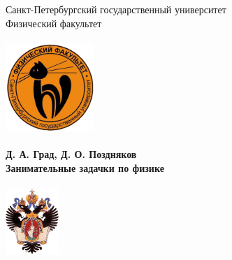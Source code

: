 \begin{titlepage}
\thispagestyle{empty}
\begin{center}
{\large{Санкт-Петербургский государственный университет}}\\[0.15cm]
{\large Физический факультет}\\[0.15cm]
\mbox{}\\[1.5cm]
\includegraphics[width=0.25\textwidth]{./Phys_logo} \\[1.5cm]
\HRule \\[0.4cm]
{ \large{ \bfseries {Д. А. Град, Д. О. Поздняков}\\[0.25cm]
\bfseries {Занимательные задачки по физике}\\[0.4cm]}}
\HRule \\[1.5cm]


\includegraphics[width=0.15\textwidth]{./SPbGU_logo}

\end{center}
\end{titlepage}